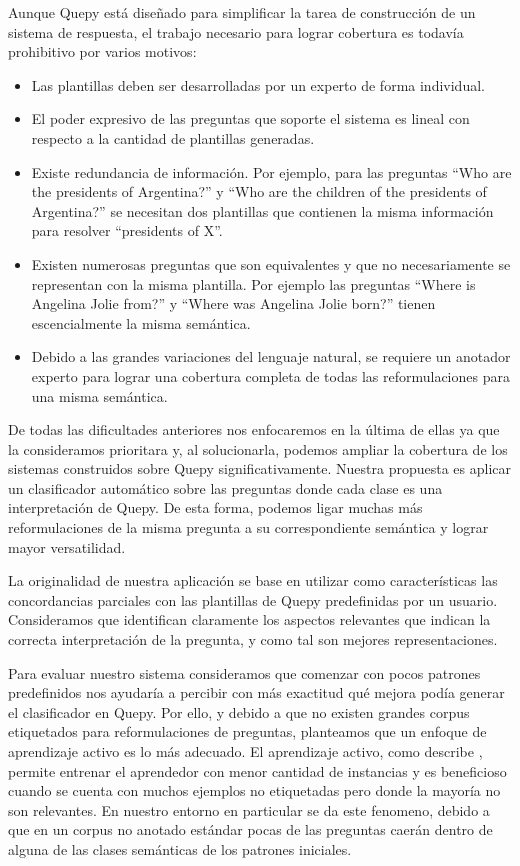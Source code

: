 Aunque Quepy está diseñado para simplificar la tarea de construcción de un sistema de respuesta, el trabajo necesario para lograr cobertura es todavía prohibitivo por varios motivos:
\begin{itemize}
    \item Las plantillas deben ser desarrolladas por un experto de forma individual.
    \item El poder expresivo de las preguntas que soporte el sistema es lineal con respecto a la cantidad de plantillas generadas.
    \item Existe redundancia de información. Por ejemplo, para las preguntas ``Who are the presidents of Argentina?'' y ``Who are the children of the presidents of Argentina?'' se necesitan dos plantillas que contienen la misma información para resolver ``presidents of X''.
    \item Existen numerosas preguntas que son equivalentes y que no necesariamente se representan con la misma plantilla. Por ejemplo las preguntas ``Where is Angelina Jolie from?'' y ``Where was Angelina Jolie born?'' tienen escencialmente la misma semántica.
    \item Debido a las grandes variaciones del lenguaje natural, se requiere un anotador experto para lograr una cobertura completa de todas las reformulaciones para una misma semántica.
\end{itemize}

De todas las dificultades anteriores nos enfocaremos en la última de ellas ya que la consideramos prioritara y, al solucionarla, podemos ampliar la cobertura de los sistemas construidos sobre Quepy significativamente. Nuestra propuesta es aplicar un clasificador automático sobre las preguntas donde cada clase es una interpretación de Quepy. De esta forma, podemos ligar muchas más reformulaciones de la misma pregunta a su correspondiente semántica y lograr mayor versatilidad.

La originalidad de nuestra aplicación se base en utilizar como características las concordancias parciales con las plantillas de Quepy predefinidas por un usuario. Consideramos que identifican claramente los aspectos relevantes que indican la correcta interpretación de la pregunta, y como tal son mejores representaciones. 

Para evaluar nuestro sistema consideramos que comenzar con pocos patrones predefinidos nos ayudaría a percibir con más exactitud qué mejora podía generar el clasificador en Quepy. Por ello, y debido a que no existen grandes corpus etiquetados para reformulaciones de preguntas, planteamos que un enfoque de aprendizaje activo es lo más adecuado. El aprendizaje activo, como describe \citet{settles_active_learning_survey}, permite entrenar el aprendedor con menor cantidad de instancias y es beneficioso cuando se cuenta con muchos ejemplos no etiquetadas pero donde la mayoría no son relevantes. En nuestro entorno en particular se da este fenomeno, debido a que en un corpus no anotado estándar pocas de las preguntas caerán dentro de alguna de las clases semánticas de los patrones iniciales.

